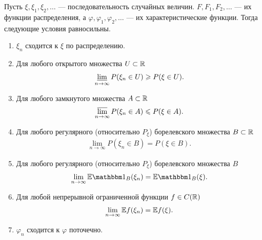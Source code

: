 \documentclass[../main.tex]{subfiles}
\begin{document}
\begin{thm}
 Пусть $ \xi, \xi_1, \xi_2, \ldots $ --- последовательность случайных величин. $ F, F_1, F_2, \ldots $ --- их функции распределения, а $ \varphi, \varphi_1, \varphi_2, \ldots $ --- их характеристические функции. Тогда следующие условия равносильны.
 \begin{enumerate}
  \item $ \xi_n $ сходится к $ \xi $ по распределению.
  \item Для любого открытого множества $ U \subset \mathbb{R} $
   \begin{align*}
    \varliminf_{n \to \infty} P(\xi_n \in U) \geqslant P(\xi \in U).
   \end{align*}
  \item Для любого замкнутого множества $ A \subset \mathbb{R} $
   \begin{align*}
    \varlimsup_{n \to \infty} P(\xi_n \in A) \leqslant P(\xi \in A).
   \end{align*}
  \item Для любого регулярного (относительно $ P_\xi $) борелевского множества $ B \subset \mathbb{R}$
   \begin{align*}
    \lim_{n \to \infty} P(\xi_n \in B) = P(\xi \in B).
   \end{align*}
  \item Для любого регулярного (относительно $ P_\xi $) борелевского множества $ B $
   \begin{align*}
    \lim_{n \to \infty} \E \Ind_B(\xi_n) = \E \Ind_B(\xi).
   \end{align*}
  \item Для любой непрерывной ограниченной функции $ f \in C(\mathbb{R}) $
   \begin{align*}
    \lim_{n \to \infty} \mathbb E f(\xi_n) = \mathbb E f(\xi).
   \end{align*}
  \item $ \varphi_n $ сходится к $ \varphi $ поточечно.
 \end{enumerate}
\end{thm}
\end{document}
